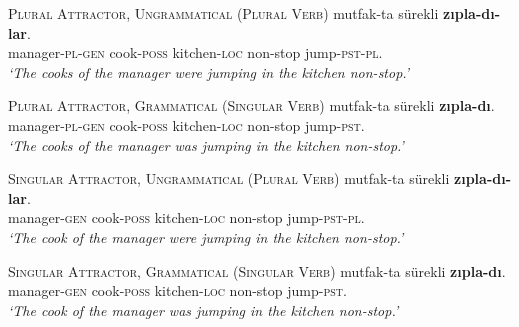 \documentclass[
  english,
  doc,floatsintext]{apa6}
\begin{document}
\begin{exe}
\ex \label{item:exp1ExperimentalItems}
  \begin{xlist}

  \ex \textsc{Plural Attractor, Ungrammatical (Plural Verb)} \label{item:exp1expitem-plpl} 
   mutfak-ta sürekli \textbf{zıpla-dı-lar}.\\ 
  manager-\textsc{pl}-\textsc{gen}  cook-\textsc{poss} kitchen-\textsc{loc} non-stop  jump-\textsc{pst}-\textsc{pl}.\\
  \glt \textit{`The cooks of the manager were jumping in the kitchen non-stop.'}

\ex \textsc{Plural Attractor, Grammatical (Singular Verb)} \label{item:exp1expitem-plsg} 
   mutfak-ta sürekli \textbf{zıpla-dı}.\\ 
  manager-\textsc{pl}-\textsc{gen}  cook-\textsc{poss} kitchen-\textsc{loc} non-stop  jump-\textsc{pst}.\\
  \glt \textit{`The cooks of the manager was jumping in the kitchen non-stop.'}

\ex \textsc{Singular Attractor, Ungrammatical (Plural Verb)} \label{item:exp1expitem-sgpl} 
   mutfak-ta sürekli \textbf{zıpla-dı-lar}.\\ 
  manager-\textsc{gen}  cook-\textsc{poss} kitchen-\textsc{loc} non-stop  jump-\textsc{pst}-\textsc{pl}.\\
  \glt \textit{`The cook of the manager were jumping in the kitchen non-stop.'}

\ex \textsc{Singular Attractor, Grammatical (Singular Verb)}\label{item:exp1expitem-sgsg}
   mutfak-ta sürekli \textbf{zıpla-dı}. \\ 
  manager-\textsc{gen}  cook-\textsc{poss} kitchen-\textsc{loc} non-stop  jump-\textsc{pst}.\\
  \glt \textit{`The cook of the manager was jumping in the kitchen non-stop.'}
  \end{xlist}
\end{exe}
\end{document}

